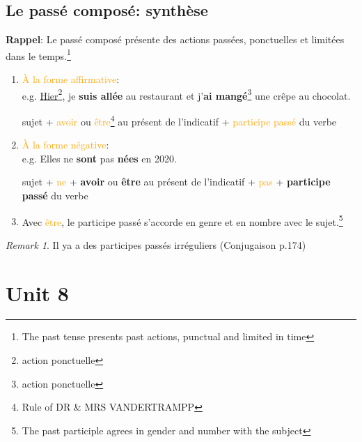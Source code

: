 \documentclass[math,code]{amznotes}
\theoremstyle{remark}
\newtheorem*{remark}{Remark}
\begin{document}
\section{Le passé composé: synthèse}
\textbf{Rappel}: Le passé composé présente des actions passées, ponctuelles et limitées dans le temps.\footnote{The past tense presents past actions, punctual and limited in time}
\begin{enumerate}
    \item \textcolor{orange}{À la forme affirmative}:\\
    e.g. \underline{Hier}\footnote{action ponctuelle}, je \textbf{suis allée} au restaurant et j'\textbf{ai mangé}\footnote{action ponctuelle} une crêpe au chocolat.
    \begin{center}
        sujet + \textcolor{orange}{avoir} ou \textcolor{orange}{être}\footnote{Rule of DR \& MRS VANDERTRAMPP} au présent de l'indicatif + \textcolor{orange}{participe passé} du verbe
    \end{center}
    \item \textcolor{orange}{À la forme négative}: \\
    e.g. Elles ne \textbf{sont} pas \textbf{nées} en 2020.
    \begin{center}
        sujet + \textcolor{orange}{ne} + \textbf{avoir} ou \textbf{être} au présent de l'indicatif + \textcolor{orange}{pas} + \textbf{participe passé} du verbe
    \end{center}
    \item Avec \textcolor{orange}{être}, le participe passé s'accorde en genre et en nombre avec le sujet.\footnote{The past participle agrees in gender and number with the subject}
\end{enumerate}
\begin{notebox}
    \begin{remark}
        Il ya a des participes passés irréguliers (Conjugaison p.174)
    \end{remark}
\end{notebox}

\chapter{Unit 8}
\end{document}
